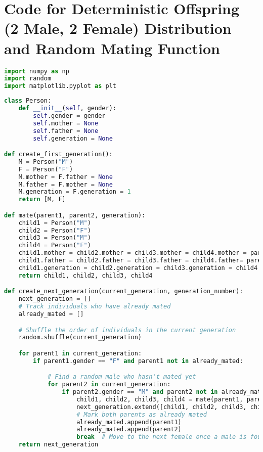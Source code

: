 \section*{Code for Deterministic Offspring (2 Male, 2 Female) Distribution and Random Mating Function}
\begin{lstlisting}[language=Python]
import numpy as np
import random
import matplotlib.pyplot as plt
\end{lstlisting}
\begin{lstlisting}[language=Python]
class Person:
    def __init__(self, gender):
        self.gender = gender
        self.mother = None
        self.father = None
        self.generation = None

def create_first_generation():
    M = Person("M")
    F = Person("F")
    M.mother = F.father = None
    M.father = F.mother = None
    M.generation = F.generation = 1
    return [M, F]

def mate(parent1, parent2, generation):
    child1 = Person("M")
    child2 = Person("F")
    child3 = Person("M")
    child4 = Person("F")
    child1.mother = child2.mother = child3.mother = child4.mother = parent1
    child1.father = child2.father = child3.father = child4.father= parent2
    child1.generation = child2.generation = child3.generation = child4.generation = generation
    return child1, child2, child3, child4

def create_next_generation(current_generation, generation_number):
    next_generation = []
    # Track individuals who have already mated
    already_mated = []

    # Shuffle the order of individuals in the current generation
    random.shuffle(current_generation)

    for parent1 in current_generation:
        if parent1.gender == "F" and parent1 not in already_mated:

            # Find a random male who hasn't mated yet
            for parent2 in current_generation:
                if parent2.gender == "M" and parent2 not in already_mated:
                    child1, child2, child3, child4 = mate(parent1, parent2, generation_number)
                    next_generation.extend([child1, child2, child3, child4])
                    # Mark both parents as already mated
                    already_mated.append(parent1)
                    already_mated.append(parent2)
                    break  # Move to the next female once a male is found
    return next_generation


\end{lstlisting}
